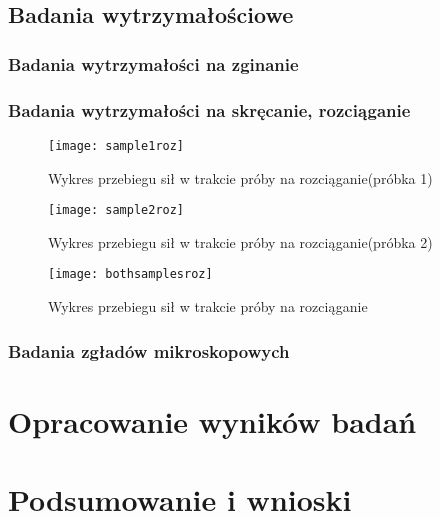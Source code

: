\documentclass[magister,druk]{dyplom}
\begin{document}
\section{Badania wytrzymałościowe}
\subsection{Badania wytrzymałości na zginanie}
\subsection{Badania wytrzymałości na skręcanie, rozciąganie}

\begin{figure}
	\texttt{[image: sample1roz]}
	\caption{Wykres przebiegu sił w trakcie próby na rozciąganie(próbka 1)}
\end{figure}

\begin{figure}
	\texttt{[image: sample2roz]}
	\caption{Wykres przebiegu sił w trakcie próby na rozciąganie(próbka 2)}
\end{figure}

\begin{figure}
	\texttt{[image: bothsamplesroz]}
	\caption{Wykres przebiegu sił w trakcie próby na rozciąganie}
\end{figure}

\subsection{Badania zgładów mikroskopowych}

\chapter{Opracowanie wyników badań}
\chapter{Podsumowanie i wnioski}

\nocite{*}


\end{document}
